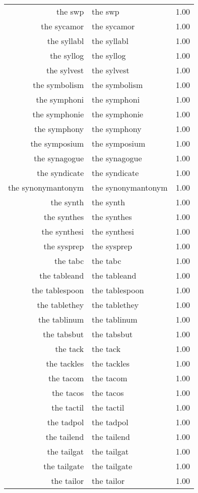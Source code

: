 \begin{table}[ht]
\begin{tabular}{rlr}
  the swp & the swp & 1.00 \\ 
  the sycamor & the sycamor & 1.00 \\ 
  the syllabl & the syllabl & 1.00 \\ 
  the syllog & the syllog & 1.00 \\ 
  the sylvest & the sylvest & 1.00 \\ 
  the symbolism & the symbolism & 1.00 \\ 
  the symphoni & the symphoni & 1.00 \\ 
  the symphonie & the symphonie & 1.00 \\ 
  the symphony & the symphony & 1.00 \\ 
  the symposium & the symposium & 1.00 \\ 
  the synagogue & the synagogue & 1.00 \\ 
  the syndicate & the syndicate & 1.00 \\ 
  the synonymantonym & the synonymantonym & 1.00 \\ 
  the synth & the synth & 1.00 \\ 
  the synthes & the synthes & 1.00 \\ 
  the synthesi & the synthesi & 1.00 \\ 
  the sysprep & the sysprep & 1.00 \\ 
  the tabc & the tabc & 1.00 \\ 
  the tableand & the tableand & 1.00 \\ 
  the tablespoon & the tablespoon & 1.00 \\ 
  the tablethey & the tablethey & 1.00 \\ 
  the tablinum & the tablinum & 1.00 \\ 
  the tabsbut & the tabsbut & 1.00 \\ 
  the tack & the tack & 1.00 \\ 
  the tackles & the tackles & 1.00 \\ 
  the tacom & the tacom & 1.00 \\ 
  the tacos & the tacos & 1.00 \\ 
  the tactil & the tactil & 1.00 \\ 
  the tadpol & the tadpol & 1.00 \\ 
  the tailend & the tailend & 1.00 \\ 
  the tailgat & the tailgat & 1.00 \\ 
  the tailgate & the tailgate & 1.00 \\ 
  the tailor & the tailor & 1.00 \\ 

\end{tabular}
\end{table}

